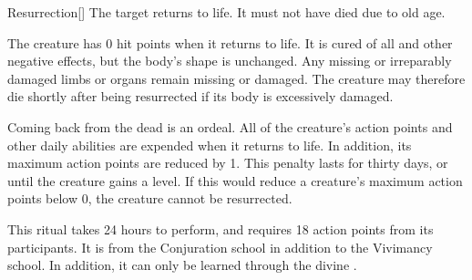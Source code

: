 \lowercase{\hypertarget{spell:Resurrection}{}}\label{spell:Resurrection}
\begin{apability}[Rank 4]{\hypertarget{spell:Resurrection}{Resurrection}}[]
The target returns to life.
It must not have died due to old age.

The creature has 0 hit points when it returns to life.
It is cured of all  and other negative effects, but the body's shape is unchanged.
Any missing or irreparably damaged limbs or organs remain missing or damaged.
The creature may therefore die shortly after being resurrected if its body is excessively damaged.

Coming back from the dead is an ordeal.
All of the creature's action points and other daily abilities are expended when it returns to life.
In addition, its maximum action points are reduced by 1.
This penalty lasts for thirty days, or until the creature gains a level.
If this would reduce a creature's maximum action points below 0, the creature cannot be resurrected.

This ritual takes 24 hours to perform, and requires 18 action points from its participants.
It is from the Conjuration school in addition to the Vivimancy school.
In addition, it can only be learned through the divine .
\end{apability}
\vspace{0.25em}



